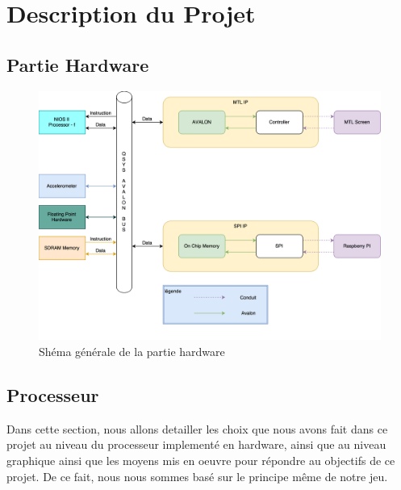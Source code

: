 

\tableofcontents

\chapter{Description du Projet}



\begin{landscape}

\chapter{Partie Hardware}
\begin{figure}[!ht]

\centering

\includegraphics[scale=0.17]{Projet_Master.png}
\caption{Shéma générale de la partie hardware}
\label{fig1}

\end{figure}

\end{landscape}

\newpage
\section{Processeur}

Dans cette section, nous allons detailler les choix que nous avons fait dans ce projet au niveau du processeur implementé en hardware, ainsi que au niveau graphique ainsi que les moyens mis en oeuvre pour répondre au objectifs de ce projet. De ce fait, nous nous sommes basé sur le principe même de notre jeu.

